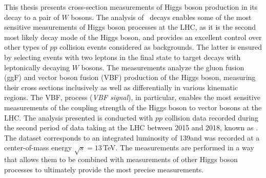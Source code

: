This thesis presents cross-section measurements of Higgs boson production in its decay to a pair of $W$ bosons.
The analysis of \HWW\ decays enables some of the most sensitive measurements of Higgs boson processes at the LHC, as it is the second most likely decay mode of the Higgs boson, and provides an excellent control over other types of $pp$ collision events considered as backgrounds. The latter is ensured by selecting events with two leptons in the final state to target \HWWdet decays with leptonically decaying $W$ bosons.
The measurements analyze the gluon fusion (ggF) and vector boson fusion (VBF) production of the Higgs boson, measuring their cross sections inclusively as well as differentially in various kinematic regions.
The VBF, \HWWdet process (\emph{VBF signal}), in particular, enables the most sensitive measurements of the coupling strength of the Higgs boson to vector bosons at the LHC. 
The analysis presented is conducted with $pp$ collision data recorded during the second period of data taking at the LHC between 2015 and 2018, known as \RunTwo. The dataset corresponds to an integrated luminosity of 139\ifb and was recorded at a center-of-mass energy $\sqrt{s} = 13\,$TeV.
The measurements are performed in a way that allows them to be combined with measurements of other Higgs boson processes to ultimately provide the most precise measurements.

